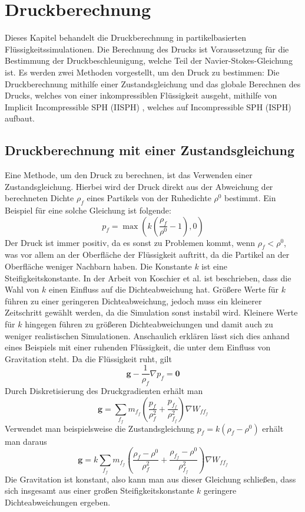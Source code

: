 \documentclass[11pt,
a4paper,
parskip=half, %
BCOR=10mm, %
english,
ngerman]{scrreprt}
\begin{document}
\chapter{Druckberechnung}
Dieses Kapitel behandelt die Druckberechnung in partikelbasierten Flüssigkeitssimulationen.
Die Berechnung des Drucks ist Voraussetzung für die Bestimmung der Druckbeschleunigung, welche Teil der Navier-Stokes-Gleichung ist.
Es werden zwei Methoden vorgestellt, um den Druck zu bestimmen:
Die Druckberechnung mithilfe einer Zustandsgleichung und das globale Berechnen des Drucks, welches von einer inkompressiblen Flüssigkeit ausgeht,
mithilfe von Implicit Incompressible SPH (IISPH) \cite{ihmsen_implicit_2014}, 
welches auf Incompressible SPH (ISPH) \cite{shao_incompressible_2003} aufbaut.


\section{Druckberechnung mit einer Zustandsgleichung}
Eine Methode, um den Druck zu berechnen, ist das Verwenden einer Zustandsgleichung.
Hierbei wird der Druck direkt aus der Abweichung der berechneten Dichte $\rho_f$ eines Partikels von der Ruhedichte $\rho^0$ bestimmt.
Ein Beispiel für eine solche Gleichung ist folgende:
\begin{equation}
    p_f = \max \left(k \left( \frac{\rho_f}{\rho^0} - 1 \right), 0\right)
\end{equation}
Der Druck ist immer positiv, da es sonst zu Problemen kommt, wenn $\rho_f < \rho^0$, was vor allem an der Oberfläche der Flüssigkeit auftritt,
da die Partikel an der Oberfläche weniger Nachbarn haben.
Die Konstante $k$ ist eine Steifigkeitskonstante.
In der Arbeit von Koschier et al. \cite{koschier_smoothed_2020} ist beschrieben, dass die Wahl von $k$ einen Einfluss auf die Dichteabweichung hat.
Größere Werte für $k$ führen zu einer geringeren Dichteabweichung, jedoch muss ein kleinerer Zeitschritt gewählt werden, da die Simulation sonst instabil wird.
Kleinere Werte für $k$ hingegen führen zu größeren Dichteabweichungen und damit auch zu weniger realistischen Simulationen.
Anschaulich erklären lässt sich dies anhand eines Beispiels mit einer ruhenden Flüssigkeit, die unter dem Einfluss von Gravitation steht.
Da die Flüssigkeit ruht, gilt
\begin{equation}
    \textbf{g} - \frac{1}{\rho_f}\nabla p_f = \textbf{0}
\end{equation}
Durch Diskretisierung des Druckgradienten erhält man
\begin{equation}
    \textbf{g} = \sum_{f_f} m_{f_f} \left( \frac{p_f}{\rho_f^2} + \frac{p_{f_f}}{\rho_{f_f}^2} \right) \nabla W_{ff_f}
\end{equation}
Verwendet man beispielsweise die Zustandsgleichung $p_f = k(\rho_f - \rho^0)$ erhält man daraus
\begin{equation}
    \textbf{g} = k \sum_{f_f} m_{f_f} \left( \frac{\rho_f - \rho^0}{\rho_f^2} + \frac{\rho_{f_f} - \rho^0}{\rho_{f_f}^2} \right) \nabla W_{ff_f}
\end{equation}
Die Gravitation ist konstant,
also kann man aus dieser Gleichung schließen, dass sich insgesamt aus einer großen Steifigkeitskonstante $k$ geringere Dichteabweichungen ergeben.
\end{document}
